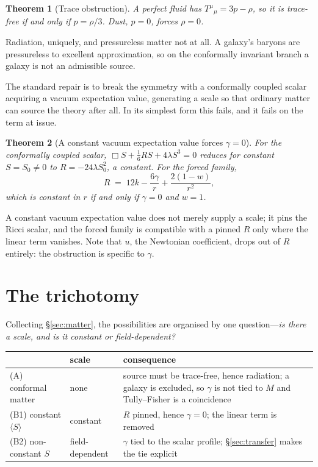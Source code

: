 \documentclass[11pt]{article}
\newtheorem{theorem}{Theorem}[section]
\theoremstyle{definition}
\theoremstyle{remark}
\begin{document}
\begin{theorem}[Trace obstruction]
\label{thm:trace}
A perfect fluid has \(T^{\mu}{}_{\mu}=3p-\rho\), so it is trace-free if and
only if \(p=\rho/3\).  Dust, \(p=0\), forces \(\rho=0\).
\end{theorem}

Radiation, uniquely, and pressureless matter not at all.  A galaxy's baryons
are pressureless to excellent approximation, so on the conformally invariant
branch a galaxy is not an admissible source.

The standard repair is to break the symmetry with a conformally coupled
scalar acquiring a vacuum expectation value, generating a scale so that
ordinary matter can source the theory after all.  In its simplest form this
fails, and it fails on the term at issue.

\begin{theorem}[A constant vacuum expectation value forces \(\gamma=0\)]
\label{thm:vev}
For the conformally coupled scalar, \(\Box S+\tfrac{1}{6}RS+4\lambda S^{3}=0\)
reduces for constant \(S=S_{0}\neq0\) to \(R=-24\lambda S_{0}^{2}\), a
constant.  For the forced family,
\[
  R \;=\; 12k-\frac{6\gamma}{r}+\frac{2(1-w)}{r^{2}},
\]
which is constant in \(r\) if and only if \(\gamma=0\) and \(w=1\).
\end{theorem}

A constant vacuum expectation value does not merely supply a scale; it pins
the Ricci scalar, and the forced family is compatible with a pinned \(R\)
only where the linear term vanishes.  Note that \(u\), the Newtonian
coefficient, drops out of \(R\) entirely: the obstruction is specific to
\(\gamma\).

\section{The trichotomy}
\label{sec:trichotomy}

Collecting \S\ref{sec:matter}, the possibilities are organised by one
question---\emph{is there a scale, and is it constant or field-dependent?}

\begin{center}
\begin{tabularx}{\textwidth}{@{}lYY@{}}
\toprule
& scale & consequence \\
\midrule
(A) conformal matter & none & source must be trace-free, hence radiation; a galaxy is excluded, so \(\gamma\) is not tied to \(M\) and Tully--Fisher is a coincidence \\
(B1) constant \(\langle S\rangle\) & constant & \(R\) pinned, hence \(\gamma=0\); the linear term is removed \\
(B2) non-constant \(S\) & field-dependent & \(\gamma\) tied to the scalar profile; \S\ref{sec:transfer} makes the tie explicit \\
\bottomrule
\end{tabularx}
\end{center}
\end{document}
